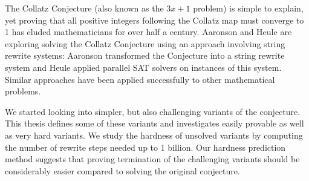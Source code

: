 \documentclass[12pt]{report}	%
\begin{document}
%
\utabstract
{}%
\indent
The Collatz Conjecture (also known as the $3x+1$ problem) is simple to explain, yet proving that all positive integers following the Collatz map must converge to 1 has eluded mathematicians for over half a century. Aaronson and Heule are exploring solving the Collatz Conjecture using an approach involving string rewrite systems: Aaronson transformed the Conjecture into a string rewrite system and Heule applied parallel SAT solvers on instances of this system. Similar approaches have been applied successfully to other mathematical problems.\par
We started looking into simpler, but also challenging variants of the conjecture. This thesis defines some of these variants and investigates easily provable as well as very hard variants. We study the hardness of unsolved variants by computing the number of rewrite steps needed up to 1 billion. Our hardness prediction method suggests that proving termination of the challenging variants should be considerably easier compared to solving the original conjecture.
\tableofcontents   %

\listoffigures     %



%
%

\end{document}
